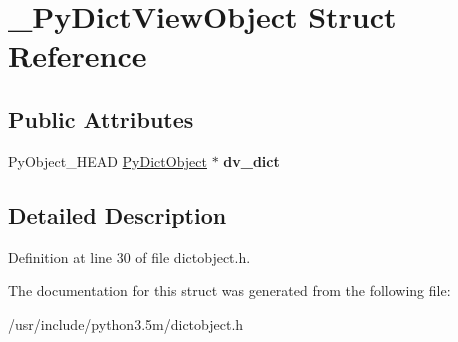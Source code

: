 \hypertarget{struct__PyDictViewObject}{}\section{\+\_\+\+Py\+Dict\+View\+Object Struct Reference}
\label{struct__PyDictViewObject}
\subsection*{Public Attributes}
\begin{DoxyCompactItemize}
\item 
Py\+Object\+\_\+\+H\+E\+AD \hyperlink{structPyDictObject}{Py\+Dict\+Object} $\ast$ {\bfseries dv\+\_\+dict}\hypertarget{struct__PyDictViewObject_a49a9cfcb0117dd4e5f610649a1fde19c}{}\label{struct__PyDictViewObject_a49a9cfcb0117dd4e5f610649a1fde19c}

\end{DoxyCompactItemize}


\subsection{Detailed Description}


Definition at line 30 of file dictobject.\+h.



The documentation for this struct was generated from the following file\+:\begin{DoxyCompactItemize}
\item 
/usr/include/python3.\+5m/dictobject.\+h\end{DoxyCompactItemize}
